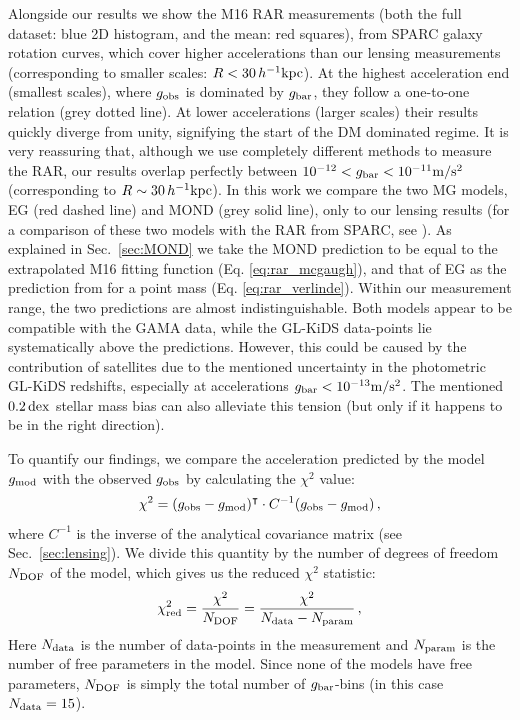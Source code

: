 \documentclass[usenatbib]{mnras}
\newcommand{\hkpc}{\, h^{-1}{\rm{kpc}} }
\newcommand{\mpss}{ {\rm m/s^2} }
\newcommand{\un}[1]{_{\rm #1}}
\newcommand{\dex}{\, {\rm dex}}
\begin{document}
Alongside our results we show the M16 RAR measurements (both the full dataset: blue 2D histogram, and the mean: red squares), from SPARC galaxy rotation curves, which cover higher accelerations than our lensing measurements (corresponding to smaller scales: $R < 30 \hkpc$). At the highest acceleration end (smallest scales), where $g\un{obs}$ is dominated by $g\un{bar}$, they follow a one-to-one relation (grey dotted line). At lower accelerations (larger scales) their results quickly diverge from unity, signifying the start of the DM dominated regime. It is very reassuring that, although we use completely different methods to measure the RAR, our results overlap perfectly between $10^{-12} < g\un{bar} < 10^{-11} \mpss$ (corresponding to $R \sim 30 \hkpc$). In this work we compare the two MG models, EG (red dashed line) and MOND (grey solid line), only to our lensing results (for a comparison of these two models with the RAR from SPARC, see \citealt{lelli2017a}). As explained in Sec.~\ref{sec:MOND} we take the MOND prediction to be equal to the extrapolated M16 fitting function (Eq. \ref{eq:rar_mcgaugh}), and that of EG as the prediction from \cite{verlinde2016} for a point mass (Eq. \ref{eq:rar_verlinde}). Within our measurement range, the two predictions are almost indistinguishable. Both models appear to be compatible with the GAMA data, while the GL-KiDS data-points lie systematically above the predictions. However, this could be caused by the contribution of satellites due to the mentioned uncertainty in the photometric GL-KiDS redshifts, especially at accelerations $g\un{bar} < 10^{-13} \mpss$. The mentioned $0.2 \dex$ stellar mass bias can also alleviate this tension (but only if it happens to be in the right direction).

To quantify our findings, we compare the acceleration predicted by the model $g\un{mod}$ with the observed $g\un{obs}$ by calculating the $\chi^2$ value:
\begin{equation}
\chi^2 = (g\un{obs} - g\un{mod})^\intercal \cdot C^{-1}(g\un{obs} - g\un{mod}) \, ,
\label{eq:chi2}
\end{equation}
where $C^{-1}$ is the inverse of the analytical covariance matrix (see Sec.~\ref{sec:lensing}). We divide this quantity by the number of degrees of freedom $N\un{DOF}$ of the model, which gives us the reduced $\chi^2$ statistic:
\begin{equation}
\chi\un{red}^2 = \frac{\chi^2}{N\un{DOF}} = \frac{\chi^2}{N\un{data} - N\un{param}} \, ,
\end{equation}
Here $N\un{data}$ is the number of data-points in the measurement and $N\un{param}$ is the number of free parameters in the model. Since none of the models have free parameters, $N\un{DOF}$ is simply the total number of $g\un{bar}$-bins (in this case $N\un{data}= 15$).
\end{document}
